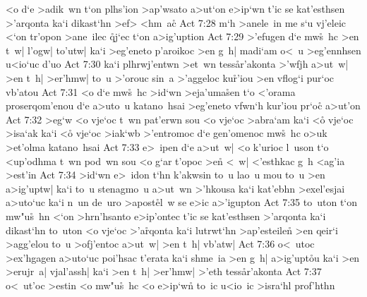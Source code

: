 <o
d`e
>adik~wn
t`on
plhs'ion
>ap'wsato
a>ut`on
e>ip`wn
t'ic
se
kat'esthsen
>'arqonta
ka`i
dikast`hn
>ef>
<hm~a\r{c}\bibvsend
{}
\vs Act 7:28
m`h
>anele~in
me
s`u
vj'eleic
<`on
tr'opon
>ane~ilec
\r{q}j`ec
t`on
a>ig'uption\bibvsend
\vs Act 7:29
>'efugen
d`e
mw\r{s}~hc
>en
t~w|
l'ogw|
to'utw|
ka`i
>eg'eneto
p'aroikoc
>en
g~h|
madi`am
o<~u
>eg'ennhsen
u<io`uc
d'uo\bibvsend
\vs Act 7:30
ka`i
plhrwj'entwn
>et~wn
tess\r{a}r'akonta
>'wfjh
a>ut~w|
>en
t~h|
>er'hmw|
to~u
>'orouc
sin~a
>'aggeloc
ku\r{r}'iou
>en
vflog`i
pur`oc
vb'atou\bibvsend
\vs Act 7:31
<o
d`e
mw\r{s}~hc
>id`wn
>eja'uma\r{s}en
t`o
<'orama
proserqom'enou
d`e
a>uto~u
katano~hsai
>eg'eneto
vfwn`h
kur'iou
pr`oc\r{}
a>ut'on\bibvsend
\vs Act 7:32
>eg`w
<o
vje`oc
t~wn
pat'erwn
sou
<o
vje`oc
>abra`am
ka`i
<o\r{}
vje`oc
>isa`ak
ka`i
<o\r{}
vje`oc
>iak`wb
>'entromoc
d`e
gen'omenoc
mw\r{s}~hc
o>uk
>et'olma
katano~hsai\bibvsend
\vs Act 7:33
e>~ipen
d`e
a>ut~w|
<o
k'urioc
l~uson
t`o
<up'odhma
t~wn
pod~wn
sou
<o
g`ar
t'opoc
>e\r{n}
<~w|
<'esthkac
g~h
<ag'ia
>est'in\bibvsend
\vs Act 7:34
>id`wn
e>~idon
t`hn
k'akwsin
to~u
lao~u
mou
to~u
>en
a>ig'uptw|
ka`i
to~u
stenagmo~u
a>ut~wn
>'hkousa
ka`i
kat'ebhn
>exel'esjai
a>uto`uc
ka`i
n~un
de~uro
>apost\r{e}l~w
se
e>ic
a>'igupton\bibvsend
\vs Act 7:35
to~uton
t`on
mw"u\r{s}~hn
<`on
>hrn'hsanto
e>ip'ontec
t'ic
se
kat'esthsen
>'arqonta
ka`i
dikast`hn
to~uton
<o
vje`oc
>'a\r{r}qonta
ka`i
lutrwt`hn
>ap'esteilen\r{}
>en
qeir`i
>agg'elou
to~u
>ofj'entoc
a>ut~w|
>en
t~h|
vb'atw|\bibvsend
\vs Act 7:36
o<~utoc
>ex'hgagen
a>uto`uc
poi'hsac
t'erata
ka`i
shme~ia
>en
g~h|
a>ig'upt\r{o}u
ka`i
>en
>erujr~a|
vjal'assh|
ka`i
>en
t~h|
>er'hmw|
>'eth
tess\r{a}r'akonta\bibvsend
{}
\vs Act 7:37
o<~ut'oc
>estin
<o
mw"u\r{s}~hc
<o
e>ip`w\r{n}
to~ic
u<io~ic
>isra`hl
prof'hthn

